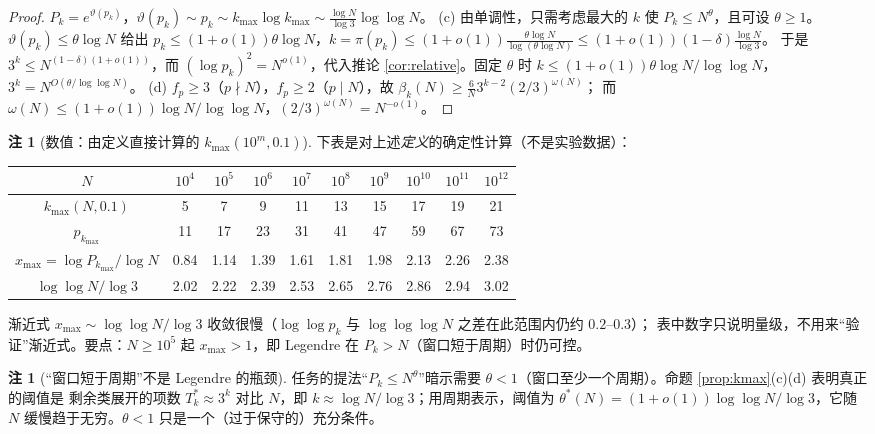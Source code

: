 \documentclass[11pt,a4paper]{article}
\newcommand{\Tmix}{T^{*}}               %
\newcommand{\kmax}{k_{\max}}
\theoremstyle{plain}
\theoremstyle{definition}
\newtheorem{rem}[prop]{注}
\begin{document}
\begin{CJK}{UTF8}{gbsn}
\begin{proof}
$P_k=e^{\vartheta(p_k)}$，$\vartheta(p_k)\sim p_k\sim\kmax\log\kmax\sim\frac{\log N}{\log3}\log\log N$。
(c) 由单调性，只需考虑最大的 $k$ 使 $P_k\le N^\theta$，且可设 $\theta\ge1$。$\vartheta(p_k)\le\theta\log N$ 给出
$p_k\le(1+o(1))\theta\log N$，$k=\pi(p_k)\le(1+o(1))\frac{\theta\log N}{\log(\theta\log N)}\le(1+o(1))(1-\delta)\frac{\log N}{\log3}$。
于是 $3^k\le N^{(1-\delta)(1+o(1))}$，而 $(\log p_k)^2=N^{o(1)}$，代入推论 \ref{cor:relative}。固定 $\theta$ 时
$k\le(1+o(1))\theta\log N/\log\log N$，$3^k=N^{O(\theta/\log\log N)}$。
(d) $f_p\ge3$（$p\nmid N$），$f_p\ge2$（$p\mid N$），故 $\beta_k(N)\ge\frac6N3^{k-2}(2/3)^{\omega(N)}$；
而 $\omega(N)\le(1+o(1))\log N/\log\log N$，$(2/3)^{\omega(N)}=N^{-o(1)}$。
\end{proof}

\begin{rem}[数值：由定义直接计算的 $\kmax(10^m,0.1)$]\label{rem:kmaxtable}
下表是对上述\emph{定义}的确定性计算（不是实验数据）：
\begin{center}
\begin{tabular}{c|ccccccccc}
\hline
$N$ & $10^4$ & $10^5$ & $10^6$ & $10^7$ & $10^8$ & $10^9$ & $10^{10}$ & $10^{11}$ & $10^{12}$\\
\hline
$\kmax(N,0.1)$ & 5 & 7 & 9 & 11 & 13 & 15 & 17 & 19 & 21\\
$p_{\kmax}$ & 11 & 17 & 23 & 31 & 41 & 47 & 59 & 67 & 73\\
$x_{\max}=\log P_{\kmax}/\log N$ & 0.84 & 1.14 & 1.39 & 1.61 & 1.81 & 1.98 & 2.13 & 2.26 & 2.38\\
$\log\log N/\log 3$ & 2.02 & 2.22 & 2.39 & 2.53 & 2.65 & 2.76 & 2.86 & 2.94 & 3.02\\
\hline
\end{tabular}
\end{center}
渐近式 $x_{\max}\sim\log\log N/\log3$ 收敛很慢（$\log\log p_k$ 与 $\log\log\log N$ 之差在此范围内仍约 $0.2$--$0.3$）；
表中数字只说明量级，不用来“验证”渐近式。要点：$N\ge10^5$ 起 $x_{\max}>1$，即 Legendre 在 $P_k>N$（窗口短于周期）时仍可控。
\end{rem}

\begin{rem}[“窗口短于周期”不是 Legendre 的瓶颈]
任务的提法“$P_k\le N^\theta$”暗示需要 $\theta<1$（窗口至少一个周期）。命题 \ref{prop:kmax}(c)(d) 表明真正的阈值是
剩余类展开的项数 $\Tmix_k\approx3^k$ 对比 $N$，即 $k\approx\log N/\log3$；用周期表示，阈值为
$\theta^*(N)=(1+o(1))\log\log N/\log3$，它随 $N$ 缓慢趋于无穷。$\theta<1$ 只是一个（过于保守的）充分条件。
\end{rem}


\end{CJK}
\end{document}
